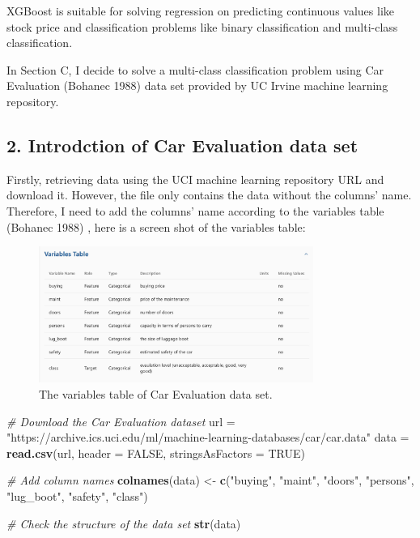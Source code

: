 \documentclass[
]{article}
\newenvironment{Shaded}{\begin{snugshade}}{\end{snugshade}}
\newcommand{\AttributeTok}[1]{\textcolor[rgb]{0.13,0.29,0.53}{#1}}
\newcommand{\CommentTok}[1]{\textcolor[rgb]{0.56,0.35,0.01}{\textit{#1}}}
\newcommand{\ConstantTok}[1]{\textcolor[rgb]{0.56,0.35,0.01}{#1}}
\newcommand{\FunctionTok}[1]{\textcolor[rgb]{0.13,0.29,0.53}{\textbf{#1}}}
\newcommand{\NormalTok}[1]{#1}
\newcommand{\OtherTok}[1]{\textcolor[rgb]{0.56,0.35,0.01}{#1}}
\newcommand{\StringTok}[1]{\textcolor[rgb]{0.31,0.60,0.02}{#1}}
\begin{document}
XGBoost is suitable for solving regression on predicting continuous
values like stock price and classification problems like binary
classification and multi-class classification.

In Section C, I decide to solve a multi-class classification problem
using Car Evaluation (Bohanec 1988) data set provided by UC Irvine
machine learning repository.

\subsection{2. Introdction of Car Evaluation data
set}\label{introdction-of-car-evaluation-data-set}

Firstly, retrieving data using the UCI machine learning repository URL
and download it. However, the file only contains the data without the
columns' name. Therefore, I need to add the columns' name according to
the variables table (Bohanec 1988) , here is a screen shot of the
variables table:

\setcounter{figure}{1}
\begin{figure}
  \centering
  \includegraphics[width=0.8\textwidth]{VariablesTable.png}
  \caption{The variables table of Car Evaluation data set.}
\end{figure}

\begin{Shaded}
\begin{Highlighting}[]
\CommentTok{\# Download the Car Evaluation dataset}
\NormalTok{url }\OtherTok{=} \StringTok{"https://archive.ics.uci.edu/ml/machine{-}learning{-}databases/car/car.data"}
\NormalTok{data }\OtherTok{=} \FunctionTok{read.csv}\NormalTok{(url, }\AttributeTok{header =} \ConstantTok{FALSE}\NormalTok{, }\AttributeTok{stringsAsFactors =} \ConstantTok{TRUE}\NormalTok{)}

\CommentTok{\# Add column names}
\FunctionTok{colnames}\NormalTok{(data) }\OtherTok{\textless{}{-}} \FunctionTok{c}\NormalTok{(}\StringTok{"buying"}\NormalTok{, }\StringTok{"maint"}\NormalTok{, }\StringTok{"doors"}\NormalTok{, }\StringTok{"persons"}\NormalTok{, }\StringTok{"lug\_boot"}\NormalTok{, }\StringTok{"safety"}\NormalTok{, }\StringTok{"class"}\NormalTok{)}

\CommentTok{\# Check the structure of the data set}
\FunctionTok{str}\NormalTok{(data)}
\end{Highlighting}
\end{Shaded}
\end{document}
